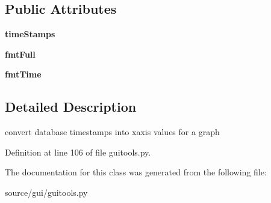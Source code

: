 \subsection*{Public Attributes}
\begin{DoxyCompactItemize}
\item 
\mbox{\label{classguitools_1_1_time_scale_draw_ac80278b40b7fbe79e938a67ced38563c}} 
{\bfseries time\+Stamps}
\item 
\mbox{\label{classguitools_1_1_time_scale_draw_acef5a720c31bd1ac40b1353ea294645b}} 
{\bfseries fmt\+Full}
\item 
\mbox{\label{classguitools_1_1_time_scale_draw_acdfd5141a42c6b11eb5b262717be5264}} 
{\bfseries fmt\+Time}
\end{DoxyCompactItemize}


\subsection{Detailed Description}
convert database timestamps into xaxis values for a graph 

Definition at line 106 of file guitools.\+py.



The documentation for this class was generated from the following file\+:\begin{DoxyCompactItemize}
\item 
source/gui/guitools.\+py\end{DoxyCompactItemize}
